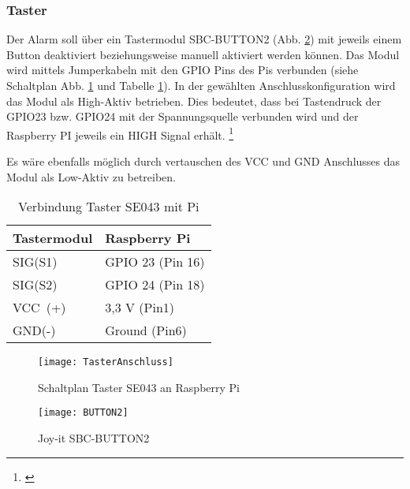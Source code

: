 \documentclass[a4paper,12pt]{article}
\begin{document}
\subsubsection{Taster}

Der Alarm soll über ein Tastermodul SBC-BUTTON2 (Abb. \ref{BUTTON2}) mit jeweils einem Button deaktiviert beziehungsweise manuell aktiviert werden können.
Das Modul wird mittels Jumperkabeln mit den GPIO Pins des Pis verbunden (siehe Schaltplan Abb. \ref{TasterAnschluss} und Tabelle \ref{TasterTabelle}). 
In der gewählten Anschlusskonfiguration wird das Modul als High-Aktiv betrieben. Dies bedeutet, dass bei Tastendruck der GPIO23 bzw. GPIO24 mit der Spannungsquelle verbunden wird und der Raspberry PI jeweils ein HIGH Signal erhält. \footnote{\cite{.19.04.2022}}\par 
Es wäre ebenfalls möglich durch vertauschen des VCC und GND Anschlusses das Modul als Low-Aktiv zu betreiben.

\begin{table}[H]
	\centering
	\begin{tabular}{|p{5cm}|p{5cm}|} 
		\hline
		Tastermodul & Raspberry Pi\\ 
		\hline
		SIG(S1)                   & GPIO 23 \hspace{0,3cm}(Pin 16)\\
		\hline
		SIG(S2)                   & GPIO 24 \hspace{0,3cm}(Pin 18)\\
		\hline
		VCC~(+)   & 3,3 V \hspace{1cm}(Pin\hspace{0,35cm}1)\\ 
		\hline
		GND(-)                   & Ground \hspace{0,6cm}(Pin\hspace{0,35cm}6)\\
		\hline
		
\end{tabular}
	\caption{Verbindung Taster SE043 mit Pi}
	\label{TasterTabelle}
\end{table}

	\begin{figure}[H]
	\centering
	\texttt{[image: TasterAnschluss]}
	\caption{Schaltplan Taster SE043 an Raspberry Pi}
	\label{TasterAnschluss}
	\end{figure}

	\begin{figure}[h] %
	\centering
	\texttt{[image: BUTTON2]}
	\caption{Joy-it SBC-BUTTON2 \cite{reicheltelektronikGmbH&amp.21.04.2022b}}
	\label{BUTTON2}
	\end{figure}
\end{document}
